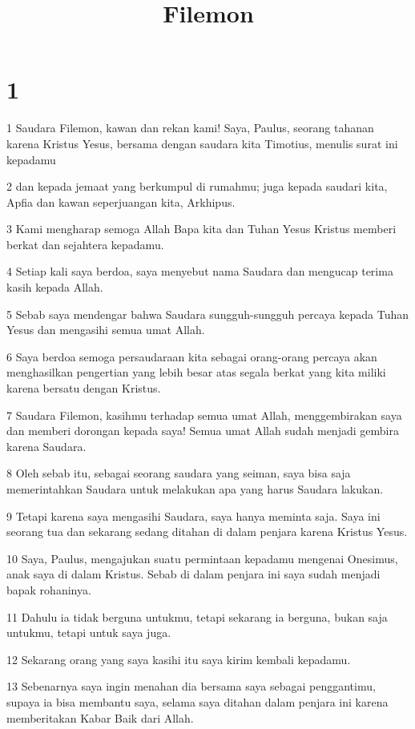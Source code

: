 

\title{Filemon}


\chapter{1}

\par 1 Saudara Filemon, kawan dan rekan kami! Saya, Paulus, seorang tahanan karena Kristus Yesus, bersama dengan saudara kita Timotius, menulis surat ini kepadamu
\par 2 dan kepada jemaat yang berkumpul di rumahmu; juga kepada saudari kita, Apfia dan kawan seperjuangan kita, Arkhipus.
\par 3 Kami mengharap semoga Allah Bapa kita dan Tuhan Yesus Kristus memberi berkat dan sejahtera kepadamu.
\par 4 Setiap kali saya berdoa, saya menyebut nama Saudara dan mengucap terima kasih kepada Allah.
\par 5 Sebab saya mendengar bahwa Saudara sungguh-sungguh percaya kepada Tuhan Yesus dan mengasihi semua umat Allah.
\par 6 Saya berdoa semoga persaudaraan kita sebagai orang-orang percaya akan menghasilkan pengertian yang lebih besar atas segala berkat yang kita miliki karena bersatu dengan Kristus.
\par 7 Saudara Filemon, kasihmu terhadap semua umat Allah, menggembirakan saya dan memberi dorongan kepada saya! Semua umat Allah sudah menjadi gembira karena Saudara.
\par 8 Oleh sebab itu, sebagai seorang saudara yang seiman, saya bisa saja memerintahkan Saudara untuk melakukan apa yang harus Saudara lakukan.
\par 9 Tetapi karena saya mengasihi Saudara, saya hanya meminta saja. Saya ini seorang tua dan sekarang sedang ditahan di dalam penjara karena Kristus Yesus.
\par 10 Saya, Paulus, mengajukan suatu permintaan kepadamu mengenai Onesimus, anak saya di dalam Kristus. Sebab di dalam penjara ini saya sudah menjadi bapak rohaninya.
\par 11 Dahulu ia tidak berguna untukmu, tetapi sekarang ia berguna, bukan saja untukmu, tetapi untuk saya juga.
\par 12 Sekarang orang yang saya kasihi itu saya kirim kembali kepadamu.
\par 13 Sebenarnya saya ingin menahan dia bersama saya sebagai penggantimu, supaya ia bisa membantu saya, selama saya ditahan dalam penjara ini karena memberitakan Kabar Baik dari Allah.
